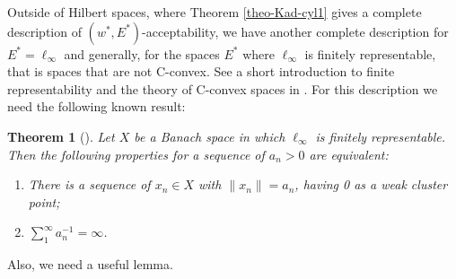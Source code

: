 \documentclass[11pt,twoside, reqno]{amsart}
\theoremstyle{plain}
\newtheorem{theorem}{Theorem}[section]
\theoremstyle{remark}
\theoremstyle{definition}
\numberwithin{equation}{section}
\begin{document}
Outside of Hilbert spaces, where Theorem \ref{theo-Kad-cyl1} gives a complete description of $(w^*, E^*)$-acceptability, we have another complete description for $E^*=\ell_\infty$ and generally, for the spaces $E^*$ where  $\ell_\infty$ is finitely representable, that is spaces that are not C-convex. See a short introduction to finite representability and the theory of  C-convex spaces in \cite[Chapter 5]{kadkad}. For this description we need the following known result:

\begin{theorem}[{\cite[Corollary 5.3]{Kad-cyl}}] \label{theor-ell_inf}
Let $X$ be a Banach space in which $\ell_\infty$ is finitely
representable. Then the following properties for a sequence of $a_n>0$ are equivalent:
\begin{enumerate}
\item There is a sequence of $x_n \in X$ with $\|x_n\|=a_n$, having 0 as a weak cluster point;
\item $\sum_1^\infty a_n^{-1}=\infty$.
\end{enumerate}
\end{theorem}

Also, we need a useful lemma.
\end{document}
